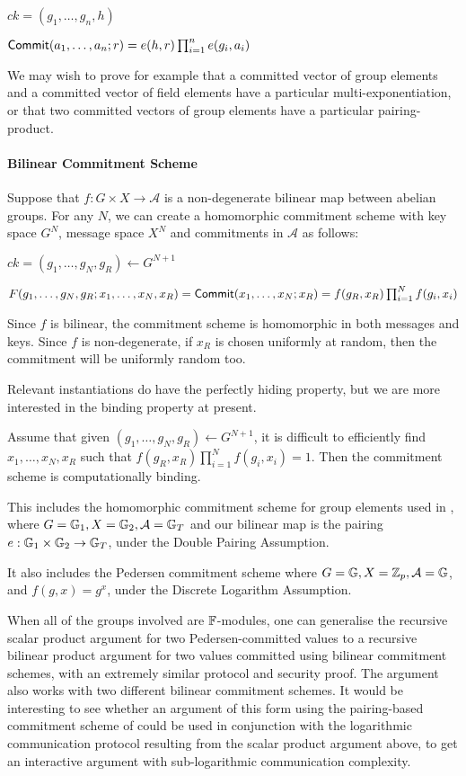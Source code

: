 $ck = (g_1,\ldots,g_n,h)$

$\mathsf{Commit} (a_1,\ldots,a_n;r) = e(h,r) \prod_{i=1}^n e(g_i,a_i)$

We may wish to prove for example that a committed vector of group elements and a committed vector of field elements have a particular multi-exponentiation, or that two committed vectors of group elements have a particular pairing-product.

\paragraph{Bilinear Commitment Scheme}

Suppose that $f : G \times X \to \mathcal{A}$ is a non-degenerate bilinear map between abelian groups. For any $N$, we can create a homomorphic commitment scheme with key space $G^N$, message space $X^N$ and commitments in $\mathcal{A}$ as follows:

$ck = (g_1,\ldots,g_N,g_R) \gets G^{N+1}$

$F(g_1,\ldots,g_N,g_R;x_1,\ldots,x_N,x_R) = \mathsf{Commit}  (x_1,\ldots,x_N;x_R) = f(g_R,x_R) \prod_{i=1}^N f(g_i,x_i)$

Since $f$ is bilinear, the commitment scheme is homomorphic in both messages and keys. Since $f$ is non-degenerate, if $x_R$ is chosen uniformly at random, then the commitment will be uniformly random too.

Relevant instantiations do have the perfectly hiding property, but we are more interested in the binding property at present.

\begin{lemma} 
Assume that given $(g_1,\ldots,g_N,g_R) \gets G^{N+1}$, it is difficult to efficiently find $x_1,\ldots,x_N,x_R$ such that $f(g_R,x_R) \prod_{i=1}^N f(g_i,x_i) = 1$. Then the commitment scheme is computationally binding.
\end{lemma}

This includes the homomorphic commitment scheme for group elements used in \cite{Groth11}, where $G = \mathbb{G}_1, X = \mathbb{G}_2, \mathcal{A} = \mathbb{G}_T$ and our bilinear map is the pairing $e : \mathbb{G}_1 \times \mathbb{G}_2 \to \mathbb{G}_T$, under the Double Pairing Assumption.

It also includes the Pedersen commitment scheme where $G = \mathbb{G}, X = \mathbb{Z}_p, \mathcal{A} = \mathbb{G}$, and $f(g,x) = g^x$, under the Discrete Logarithm Assumption.

When all of the groups involved are $\mathbb{F}$-modules, one can generalise the recursive scalar product argument for two Pedersen-committed values to a recursive bilinear product argument for two values committed using bilinear commitment schemes, with an extremely similar protocol and security proof. The argument also works with two different bilinear commitment schemes. It would be interesting to see whether an argument of this form using the pairing-based commitment scheme of \cite{Groth11} could be used in conjunction with the logarithmic communication protocol resulting from the scalar product argument above, to get an interactive argument with sub-logarithmic communication complexity.

